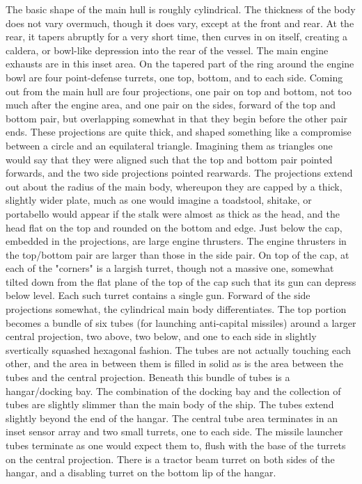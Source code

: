 The basic shape of the main hull is roughly cylindrical. The thickness of the body does not vary overmuch, though it does vary, except at the front and rear. At the rear, it tapers abruptly for a very short time, then curves in on itself, creating a caldera, or bowl-like depression into the rear of the vessel.  The main engine exhausts are in this inset area.  On the tapered part of the ring around the engine bowl are four point-defense turrets, one top, bottom, and to each side. Coming out from the main hull are four projections, one pair on top and bottom, not too much after the engine area, and one pair on the sides, forward of the top and bottom pair, but overlapping somewhat in that they begin before the other pair ends. These projections are quite thick, and shaped something like a compromise between a circle and an equilateral triangle.  Imagining them as triangles one would say that they were aligned such that the top and bottom pair pointed forwards, and the two side projections pointed rearwards.  The projections extend out about the radius of the main body, whereupon they are capped by a thick, slightly wider plate, much as one would imagine a toadstool, shitake, or portabello would appear if the stalk were almost as thick as the head, and the head flat on the top and rounded on the bottom and edge.  Just below the cap, embedded in the projections, are large engine thrusters. The engine thrusters in the top/bottom pair are larger than those in the side pair.  On top of the cap, at each of the "corners" is a largish turret, though not a massive one, somewhat tilted down from the flat plane of the top of the cap such that its gun can depress below level. Each such turret contains a single gun.  Forward of the side projections somewhat, the cylindrical main body differentiates.  The top portion becomes a bundle of six tubes (for launching anti-capital missiles) around a larger central projection, two above, two below, and one to each side in slightly svertically squashed hexagonal fashion.  The tubes are not actually touching each other, and the area in between them is filled in solid as is the area between the tubes and the central projection. Beneath this bundle of tubes is a hangar/docking bay. The combination of the docking bay and the collection of tubes are slightly slimmer than the main body of the ship. The tubes extend slightly beyond the end of the hangar.  The central tube area terminates in an inset sensor array and two small turrets, one to each side.  The missile launcher tubes terminate as one would expect them to, flush with the base of the turrets on the central projection. There is a tractor beam turret on both sides of the hangar, and a disabling turret on the bottom lip of the hangar.

